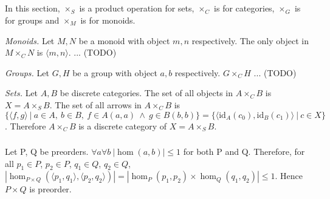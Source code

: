 \documentclass{article}
\begin{document}
\subsection{}

\subsection{}

\subsection{}

\subsubsection{}



\showArt

In this section, $\times_S$ is a product operation for sets, $\times_C$ is for categories, $\times_G$ is for groups and $\times_M$ is for monoids.

\textit{Monoids.} Let $M, N$ be a monoid with object $m, n$ respectively. The only object in $M \times_C N$ is $\langle m, n \rangle$. ... (TODO)

\textit{Groups.} Let $G, H$ be a group with object $a, b$ respectively. $G \times_C H$ ... (TODO)

\textit{Sets.} Let $A, B$ be discrete categories. The set of all objects in $A \times_C B$ is $X = A \times_S B$. The set of all arrows in $A \times_C B$ is $\{\langle f, g \rangle\ |\ a \in A,\ b \in B,\ f \in A(a, a)\ \wedge\ g \in B(b, b)\} = \{\langle \mathrm{id}_A(c_0), \mathrm{id}_B(c_1) \rangle\ |\ c \in X\}$. Therefore  $A \times_C B$ is a discrete category of $X = A \times_S B$.

\subsubsection{}



\showArt

Let P, Q be preorders. $\forall a \forall b\ | \hom(a, b) | \leq 1$ for both P and Q. Therefore, for all $p_1 \in P$, $p_2 \in P$, $q_1 \in Q$, $q_2 \in Q$, $| \hom_{P \times Q}(\langle p_1, q_1 \rangle, \langle p_2, q_2 \rangle) | = | \hom_P(p_1, p_2) \times \hom_Q(q_1, q_2) | \leq 1$. Hence $P \times Q$ is preorder.

\subsubsection{}
\end{document}
